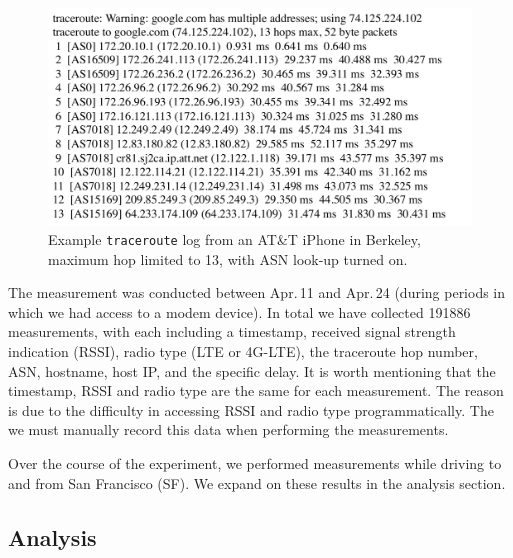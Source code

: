 \begin{figure}[!htb]
  \centering
  \includegraphics[width=1.1\linewidth]{../figs/traceroute.pdf}
  \vspace{-0.8em}
  \caption{Example \texttt{traceroute} log from an AT\&T iPhone in Berkeley, maximum hop limited to 13, with ASN look-up turned on.}
  \label{fig:traceroute}
\end{figure}


The measurement was conducted between Apr.\,11 and Apr.\,24 (during periods in which we had access to a modem device). In total we have collected 191886 measurements, with each including a timestamp, received signal strength indication (RSSI), radio type (LTE or 4G-LTE), the traceroute hop number, ASN, hostname, host IP, and the specific delay. It is worth mentioning that the timestamp, RSSI and radio type are the same for each measurement. The reason is due to the difficulty in accessing RSSI and radio type programmatically. The we must manually record this data when performing the measurements.

Over the course of the experiment, we performed measurements while driving to and from San Francisco (SF). We expand on these results in the analysis section. 

\subsection{Analysis}
\label{sec:analysis}

